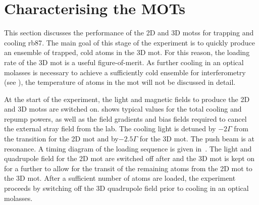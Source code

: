\section{Characterising the MOTs}\label{sec:mot_characterisation}
This section discusses the performance of the 2D and 3D \acp{mots} for trapping
and cooling \ac{rb87}. The main goal of this stage of the experiment is to
quickly produce an ensemble of trapped, cold atoms in the 3D \ac{mot}. For this
reason, the loading rate of the 3D \ac{mot} is a useful figure-of-merit. As
further cooling in an optical molasses is necessary to achieve a sufficiently
cold ensemble for interferometry (see ), the
temperature of atoms in the \ac{mot} will not be discussed in detail.
\par\noindent \nocite{Haw2012}
At the start of the experiment, the light and magnetic fields to produce the 2D
and 3D \acp{mots} are switched on.  shows
typical values for the total cooling and repump powers, as well as the field gradients
and bias fields required to cancel the external stray field from the
lab. The cooling light is detuned by \(-2 \Gamma\) from the
 transition for the 2D \ac{mot} and by\(-2.5 \Gamma\) for the 3D
\ac{mot}. The push beam is at resonance. A timing diagram of the
loading sequence is given in~. The
light and quadrupole field 
for the 2D \ac{mot} are switched off after  and the
3D \ac{mot} is kept on for a further  to allow for
the transit of the remaining atoms from the 2D \ac{mot} to the 3D \ac{mot}.
After a sufficient number of atoms are loaded, the experiment proceeds by
switching off the 3D quadrupole field prior to cooling in an optical molasses.
